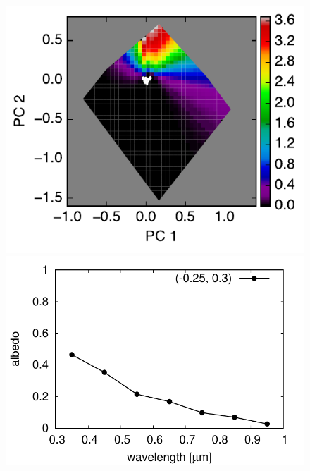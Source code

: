 \documentclass[iop,numberedappendix,apj,]{emulateapj}
\begin{document}
\begin{figure}[tbh!]
\begin{minipage}{0.33\hsize}
\begin{center}
    \end{center}	
   \end{minipage}
   \begin{minipage}{0.33\hsize}
    \begin{center}
	\includegraphics[width=\hsize]{raddata_2_norm_noreg_2.pdf}
    \end{center}	
   \end{minipage}
   \begin{minipage}{0.33\hsize}
    \begin{center}
	\includegraphics[width=\hsize]{raddata_2_norm_noreg_0_sp.pdf}
    \end{center}	
   \end{minipage}

\end{figure}
\end{document}
